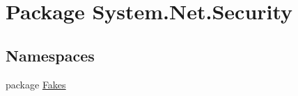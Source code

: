 \hypertarget{namespace_system_1_1_net_1_1_security}{\section{Package System.\-Net.\-Security}
\label{namespace_system_1_1_net_1_1_security}
}
\subsection*{Namespaces}
\begin{DoxyCompactItemize}
\item 
package \hyperlink{namespace_system_1_1_net_1_1_security_1_1_fakes}{Fakes}
\end{DoxyCompactItemize}
